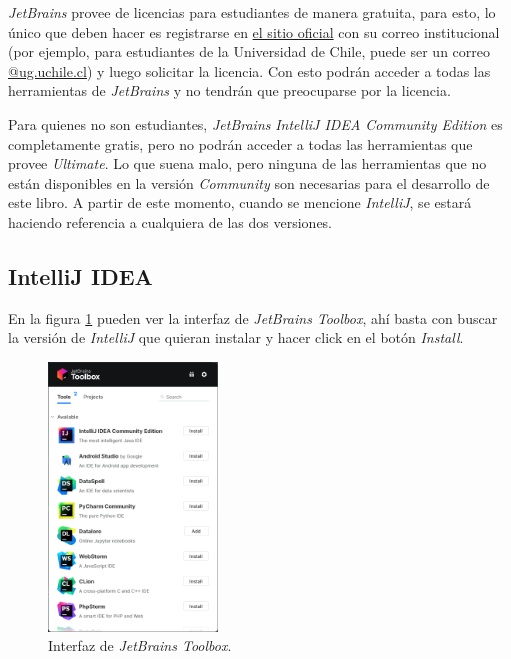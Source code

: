     \begin{note}
      \textit{JetBrains} provee de licencias para estudiantes de manera gratuita, para esto, lo único
      que deben hacer es registrarse en  
      \href{https://www.jetbrains.com/es-es/community/education/#students}{el sitio oficial} con su
      correo institucional (por ejemplo, para estudiantes de la Universidad de Chile, puede ser un
      correo \url{@ug.uchile.cl}) y luego solicitar la licencia.
      Con esto podrán acceder a todas las herramientas de \textit{JetBrains} y no tendrán que 
      preocuparse por la licencia.

      Para quienes no son estudiantes, \textit{JetBrains} \textit{IntelliJ IDEA Community Edition} es
      completamente gratis, pero no podrán acceder a todas las herramientas que provee 
      \textit{Ultimate}.
      Lo que suena malo, pero ninguna de las herramientas que no están disponibles en la versión 
      \textit{Community} son necesarias para el desarrollo de este libro. 
      A partir de este momento, cuando se mencione \textit{IntelliJ}, se estará haciendo referencia a
      cualquiera de las dos versiones.
    \end{note}

  \subsection{IntelliJ IDEA}
    En la figura \ref{fig:jb-toolbox} pueden ver la interfaz de \textit{JetBrains Toolbox}, ahí 
    basta con buscar la versión de \textit{IntelliJ} que quieran instalar y hacer click en el botón
    \textit{Install}.

    \begin{figure}[H]
      \centering
      \includegraphics[width=0.4\textwidth]{img/Por_algo_se_empieza/jetbrains-toolbox.png}
      \caption{Interfaz de \textit{JetBrains Toolbox}.}
      \label{fig:jb-toolbox}
    \end{figure}
